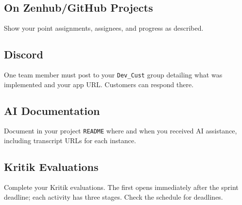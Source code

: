 \documentclass{article}
\begin{document}
\subsection*{On Zenhub/GitHub Projects}
Show your point assignments, assignees, and progress as described.

\subsection*{Discord}
One team member must post to your \texttt{Dev\_Cust} group detailing what was implemented and your app URL. Customers can respond there.

\subsection*{AI Documentation}
Document in your project \texttt{README} where and when you received AI assistance, including transcript URLs for each instance.

\subsection*{Kritik Evaluations}
Complete your Kritik evaluations. The first opens immediately after the sprint deadline; each activity has three stages. Check the schedule for deadlines.
\end{document}
